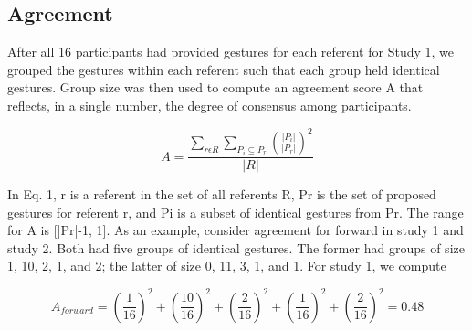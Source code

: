 \documentclass{sigchi}
\begin{document}
\subsection{Agreement}

After all 16 participants had provided gestures for each referent for Study 1, we grouped the gestures within each referent such that each group held identical gestures. Group size was then used to compute an agreement score A that reflects, in a single number, the degree of consensus among participants.

\begin{equation}
A = \frac{\displaystyle{\sum_{r\epsilon R }} \sum_{P_i \subseteq P_r } \left(\frac{\lvert{P_i}\rvert}{\lvert{P_r}\rvert}\right) ^ 2}{\displaystyle{\lvert{R}\rvert}}
\end{equation}

In Eq. 1, r is a referent in the set of all referents R, Pr is the set of proposed gestures for referent r, and Pi is a subset of identical gestures from Pr. The range for A is [|Pr|-1, 1]. As an example, consider agreement for forward in study 1 and study 2. Both had five groups of identical gestures. The former had groups of size 1, 10, 2, 1, and 2; the latter of size 0, 11, 3, 1, and 1. For study 1, we compute

\begin{equation}
   A_{forward} = \left(\frac{1}{16}\right) ^ 2  + \left(\frac{10}{16}\right) ^ 2 + \left(\frac{2}{16}\right) ^ 2 + \left(\frac{1}{16}\right) ^ 2 + \left(\frac{2}{16}\right) ^ 2= 0.48
\end{equation}
\end{document}
